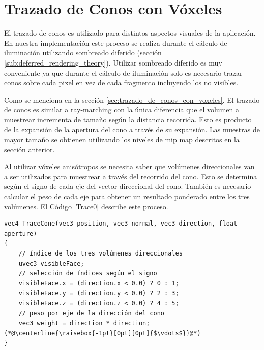 \section{Trazado de Conos con Vóxeles} %
\label{sec:trazado_de_conos}
El trazado de conos es utilizado para distintos aspectos visuales de la aplicación. En nuestra implementación este proceso se realiza durante el cálculo de iluminación utilizando sombreado diferido (sección \ref{sub:deferred_rendering_theory}). Utilizar sombreado diferido es muy conveniente ya que durante el cálculo de iluminación solo es necesario trazar conos sobre cada pixel en vez de cada fragmento incluyendo los no visibles.

Como se menciona en la sección \ref{sec:trazado_de_conos_con_voxeles}. El trazado de conos es similar a ray-marching con la única diferencia que el volumen a muestrear incrementa de tamaño según la distancia recorrida. Esto es producto de la expansión de la apertura del cono a través de su expansión. Las muestras de mayor tamaño se obtienen utilizando los niveles de mip map descritos en la sección anterior.

Al utilizar vóxeles anisótropos se necesita saber que volúmenes direccionales van a ser utilizados para muestrear a través del recorrido del cono. Esto se determina según el signo de cada eje del vector direccional del cono. También es necesario calcular el peso de cada eje para obtener un resultado ponderado entre los tres volúmenes. El Código \ref{Trace0} describe este proceso.
\\
\begin{lstlisting}[caption={Lógica para determinar volúmenes direccionales a utilizar durante el trazado de conos y peso por eje.}, label=Trace0]
vec4 TraceCone(vec3 position, vec3 normal, vec3 direction, float aperture)
{
    // índice de los tres volúmenes direccionales
    uvec3 visibleFace;
    // selección de índices según el signo
    visibleFace.x = (direction.x < 0.0) ? 0 : 1;
    visibleFace.y = (direction.y < 0.0) ? 2 : 3;
    visibleFace.z = (direction.z < 0.0) ? 4 : 5;
    // peso por eje de la dirección del cono
    vec3 weight = direction * direction;
(*@\centerline{\raisebox{-1pt}[0pt][0pt]{$\vdots$}}@*)
}
\end{lstlisting}

